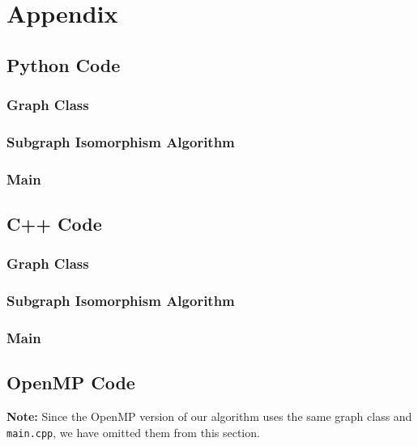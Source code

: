 \documentclass{article}
\begin{document}
\section{Appendix}
  \subsection{Python Code}
    \subsubsection{Graph Class}
      
    \subsubsection{Subgraph Isomorphism Algorithm}
      
    \subsubsection{Main}
      

  \subsection{C++ Code}
    \subsubsection{Graph Class}
      
    \subsubsection{Subgraph Isomorphism Algorithm}
      
    \subsubsection{Main}
      

  \subsection{OpenMP Code}
    \textbf{Note:} Since the OpenMP version of our algorithm uses the same graph class and \texttt{main.cpp}, we have omitted them from this section.
\end{document}
